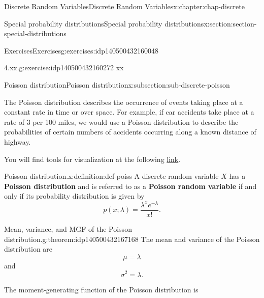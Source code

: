 \documentclass[oneside,10pt,]{book}
\newcommand{\terminology}[1]{\textbf{#1}}
\begin{document}
\begin{chapterptx}{Discrete Random Variables}{}{Discrete Random Variables}{}{}{x:chapter:chap-discrete}
\begin{sectionptx}{Special probability distributions}{}{Special probability distributions}{}{}{x:section:section-special-distributions}
\typeout{************************************************}
%
\begin{exercises-subsection}{Exercises}{}{Exercises}{}{}{g:exercises:idp140500432160048}
\begin{divisionexercise}{1}{4.xx.}{}{g:exercise:idp140500432160272}%
xx%
\end{divisionexercise}%
\end{exercises-subsection}
%
%
\typeout{************************************************}
\typeout{************************************************}
%
\begin{subsectionptx}{Poisson distribution}{}{Poisson distribution}{}{}{x:subsection:sub-discrete-poisson}
\begin{introduction}{}%
The Poisson distribution describes the occurrence of events taking place at a constant rate in time or over space.  For example, if car accidents take place at a rate of 3 per 100 miles, we would use a Poisson distribution to describe the probabilities of certain numbers of accidents occurring along a known distance of highway.%
\par
You will find tools for visualization at the following \href{https://buddy.uco.edu/shiny/slaverty/mathstat/Poisson/}{link}.%
\end{introduction}%
\begin{definition}{Poisson distribution.}{x:definition:def-poiss}%
A discrete random variable \(\displaystyle X\) has a \terminology{Poisson distribution} and is referred to as a \terminology{Poisson random variable} if and only if its probability distribution is given by%
\begin{equation*}
p(x; \lambda) = \dfrac{\lambda^x
e^{-\lambda}}{x!}\text{.}
\end{equation*}
%
\end{definition}
\begin{theorem}{Mean, variance, and MGF of the Poisson distribution.}{}{g:theorem:idp140500432167168}%
The mean and variance of the Poisson distribution are%
\begin{equation*}
\mu =
\lambda
\end{equation*}
and%
\begin{equation*}
\sigma^2 = \lambda\text{.}
\end{equation*}
%
\par
The moment-generating function of the Poisson distribution is%
\begin{equation*}

\end{equation*}
\end{theorem}
\end{subsectionptx}
\end{sectionptx}
\end{chapterptx}
\end{document}
